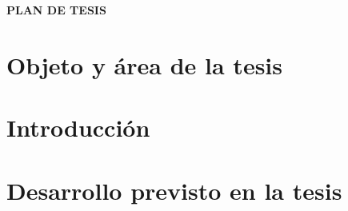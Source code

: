 \documentclass[a4paper]{article}
\begin{document}
\begin{titlepage}
    \begin{center}
    
    \vspace*{1cm}
    {\Large \textbf{PLAN DE TESIS}}
    
    \end{center}
\end{titlepage}

\newpage    

\tableofcontents
\newpage

\section{Objeto y área de la tesis}


\section{Introducción}


\section{Desarrollo previsto en la tesis}

\end{document}
